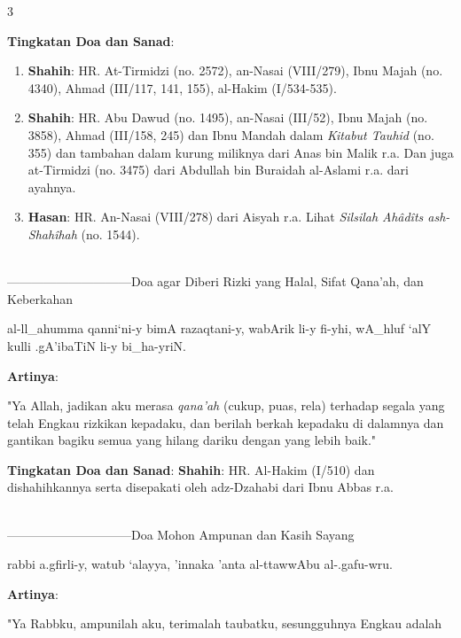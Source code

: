 \documentclass[a4paper,12pt]{article}
\begin{document}
{\scriptsize 3}\\
\par
\noindent
\textbf{Tingkatan Doa dan Sanad}:
\begin{enumerate}
\item \textbf{Shahih}: HR. At-Tirmidzi (no. 2572), an-Nasai (VIII/279), 
Ibnu Majah (no. 4340), Ahmad (III/117, 141, 155), al-Hakim (I/534-535).
\item \textbf{Shahih}: HR. Abu Dawud (no. 1495), an-Nasai (III/52), Ibnu 
Majah (no. 3858), Ahmad (III/158, 245) dan Ibnu Mandah dalam 
\textit{Kitabut Tauhid} (no. 355) dan tambahan dalam kurung miliknya dari 
Anas bin Malik r.a. Dan juga at-Tirmidzi (no. 3475) dari Abdullah bin 
Buraidah al-Aslami r.a. dari ayahnya.
\item \textbf{Hasan}: HR. An-Nasai (VIII/278) dari Aisyah r.a. Lihat 
\textit{Silsilah Ah\^{a}d\^{i}ts ash-Shah\^{i}hah} (no. 1544).\\\\
\end{enumerate}
\par
{}------------------------------Doa agar Diberi Rizki yang Halal, Sifat Qana'ah, dan
Keberkahan
\begin{arabtext}
\noindent
al-ll_ahumma qanni`ni-y bimA razaqtani-y, wabArik li-y fi-yhi, wA_hluf `alY 
kulli .gA'ibaTiN li-y bi_ha-yriN.\\
\end{arabtext}
\noindent
\textbf{Artinya}:
\par
\indent
"Ya Allah, jadikan aku merasa \textit{qana'ah} (cukup, puas, rela) terhadap
segala yang telah Engkau rizkikan kepadaku, dan berilah berkah kepadaku di 
dalamnya dan gantikan bagiku semua yang hilang dariku dengan yang lebih 
baik."\\
\par
\noindent
\textbf{Tingkatan Doa dan Sanad}: \textbf{Shahih}: HR. Al-Hakim (I/510) dan
dishahihkannya serta disepakati oleh adz-Dzahabi dari Ibnu Abbas r.a.\\\\
\par
{}------------------------------Doa Mohon Ampunan dan Kasih Sayang
\begin{arabtext}
\noindent
rabbi a.gfirli-y, watub `alayya, 'innaka 'anta al-ttawwAbu al-.gafu-wru.\\
\end{arabtext}
\noindent
\textbf{Artinya}:
\par
\indent
"Ya Rabbku, ampunilah aku, terimalah taubatku, sesungguhnya Engkau adalah 
\end{document}
